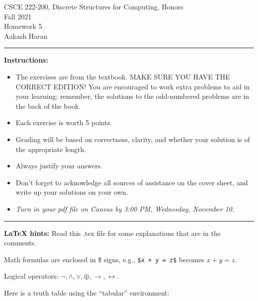 \documentclass[12pt]{article}  %
\newcommand{\NOT}{\neg}
\newcommand{\AND}{\wedge}
\newcommand{\OR}{\vee}
\newcommand{\XOR}{\oplus}
\newcommand{\IMPLIES}{\rightarrow}
\newcommand{\IFF}{\leftrightarrow}
\begin{document}
\begin{center}         %
{\large                %
CSCE 222-200, Discrete Structures for Computing, Honors \\  %
Fall 2021 \\
Homework 5 \\
Aakash Haran}
\end{center}


\rule{6in}{.1pt}       %
                    
\noindent              %
{\bf Instructions:}    %

\begin{itemize}        %
\item The exercises are from the textbook.  MAKE SURE YOU HAVE THE CORRECT
      EDITION!  You are encouraged to work
      extra problems to aid in your learning; remember, the solutions to 
      the odd-numbered problems are in the back of the book.
\item Each exercise is worth 5 points.
\item Grading will be based on correctness, clarity, and whether your
      solution is of the appropriate length.
\item Always justify your answers. 
\item Don't forget to acknowledge all sources of assistance on the cover
      sheet, and write up your solutions on your own.
\item {\em Turn in your pdf file on Canvas by 3:00 PM, Wednesday, November 10.}
\end{itemize}

\rule{6in}{.1pt}       %

\noindent
{\bf LaTeX hints:}  Read this .tex file for some explanations that are in
the comments.

Math formulas are enclosed in \$ signs, e.g., {\tt \$x + y = z\$}
becomes $x + y = z$.

Logical operators: $\NOT, \AND, \OR, \XOR, \IMPLIES, \IFF$.

Here is a truth table using the ``tabular'' environment:
\end{document}
